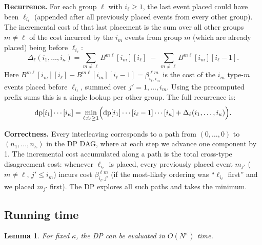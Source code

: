 \documentclass[11pt]{article}
\newtheorem{lemma}[theorem]{Lemma}
\begin{document}
\smallskip
\noindent\textbf{Recurrence.} For each group $\ell$ with $i_\ell \ge 1$, the last
event placed could have been $\ell_{i_\ell}$ (appended after all previously placed
events from every other group).  The incremental cost of that last placement is the
sum over all other groups $m \ne \ell$ of the cost incurred by the $i_m$ events from
group $m$ (which are already placed) being before $\ell_{i_\ell}$:
\begin{equation}\label{eq:increment}
  \Delta_\ell(i_1, \ldots, i_\kappa)
  = \sum_{m \ne \ell} B^{m\ell}[i_m][i_\ell]
    \;-\; \sum_{m \ne \ell} B^{m\ell}[i_m][i_\ell - 1].
\end{equation}
Here $B^{m\ell}[i_m][i_\ell] - B^{m\ell}[i_m][i_\ell - 1] = \beta_{i_\ell, i_m}^{\ell
m}$ is the cost of the $i_m$ type-$m$ events placed before $\ell_{i_\ell}$, summed
over $j' = 1, \ldots, i_m$.  Using the precomputed prefix sums this is a single
lookup per other group.  The full recurrence is:
\begin{equation}\label{eq:recurrence}
  \mathrm{dp}[i_1]\cdots[i_\kappa]
  = \min_{\substack{\ell : i_\ell \ge 1}}
    \Bigl(
      \mathrm{dp}[i_1]\cdots[i_\ell - 1]\cdots[i_\kappa]
      + \Delta_\ell(i_1, \ldots, i_\kappa)
    \Bigr).
\end{equation}

\smallskip
\noindent\textbf{Correctness.} Every interleaving corresponds to a path from
$(0,\ldots,0)$ to $(n_1,\ldots,n_\kappa)$ in the DP DAG, where at each step we
advance one component by 1.  The incremental cost accumulated along a path is the
total cross-type disagreement cost: whenever $\ell_{i_\ell}$ is placed, every
previously placed event $m_{j'}$ ($m \ne \ell$, $j' \le i_m$) incurs cost
$\beta_{i_\ell, j'}^{\ell m}$ (if the most-likely ordering was ``$\ell_{i_\ell}$
first'' and we placed $m_{j'}$ first).  The DP explores all such paths and takes the
minimum.

\subsection{Running time}

\begin{lemma}\label{lem:time}
For fixed $\kappa$, the DP can be evaluated in $O(N^\kappa)$ time.
\end{lemma}
\end{document}
